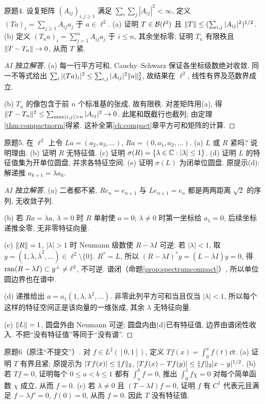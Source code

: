 \begin{exercise}\label{ps10:4}
原题4. 设复矩阵 $(A_{ij})_{i,j\ge1}$ 满足 $\sum_i\sum_j|A_{ij}|^2<\infty$, 定义 $(Ta)_i=\sum_{j\ge1}A_{ij}a_j$ 于 $a\in\ell^2$. (a) 证明 $T\in\mathcal B(\ell^2)$ 且 $\lVert T\rVert\le(\sum_{i,j}|A_{ij}|^2)^{1/2}$. (b) 定义 $(T_na)_i=\sum_{j=1}^nA_{ij}a_j$ 于 $i\le n$, 其余坐标零; 证明 $T_n$ 有限秩且 $\lVert T-T_n\rVert\to0$, 从而 $T$ 紧.
\end{exercise}
\begin{proof}[AI 独立解答]
(a) 每一行平方可和, Cauchy--Schwarz 保证各坐标级数绝对收敛. 同一不等式给出 $\sum_i|(Ta)_i|^2\le\sum_{i,j}|A_{ij}|^2\lVert a\rVert_2^2$, 故结果在 $\ell^2$, 线性有界及范数界成立.

(b) $T_n$ 的像包含于前 $n$ 个标准基的张成, 故有限秩. 对差矩阵用(a), 得 $\lVert T-T_n\rVert^2\le\sum_{\max(i,j)>n}|A_{ij}|^2\to0$. 此尾和既截行也截列; 由定理\ref{thm:compactnorm}得紧. 这补全第\ref{ch:compact}章平方可和矩阵的计算.
\end{proof}
\begin{exercise}\label{ps10:5}
原题5. 在 $\ell^2$ 上令 $La=(a_2,a_3,\ldots)$, $Ra=(0,a_1,a_2,\ldots)$. (a) $L$ 或 $R$ 紧吗? 说明理由. (b) 证明 $R$ 无特征值. (c) 证明 $\sigma(R)=\{\lambda\in\mathbb C:|\lambda|\le1\}$. (d) 证明 $L$ 的特征值集为开单位圆盘, 并求各特征空间. (e) 证明 $\sigma(L)$ 为闭单位圆盘. 原提示(d): 解递推 $a_{k+1}=\lambda a_k$.
\end{exercise}
\begin{proof}[AI 独立解答]
(a) 二者都不紧. $Re_n=e_{n+1}$ 与 $Le_{n+1}=e_n$ 都是两两距离 $\sqrt2$ 的序列, 无收敛子列.

(b) 若 $Ra=\lambda a$, $\lambda=0$ 时 $R$ 单射使 $a=0$; $\lambda\ne0$ 时第一坐标给 $a_1=0$, 后续坐标递推全零, 无非零特征向量.

(c) $\lVert R\rVert=1$, $|\lambda|>1$ 时 Neumann 级数使 $R-\lambda I$ 可逆. 若 $|\lambda|<1$, 取 $y=(1,\overline\lambda,\overline\lambda^2,\ldots)\in\ell^2\setminus\{0\}$. $R^*=L$, 所以 $(R-\lambda I)^*y=(L-\overline\lambda I)y=0$, 得 $\operatorname{ran}(R-\lambda I)\subset y^\perp\ne\ell^2$, 不可逆. 谱闭（命题\ref{prop:spectrumcompact}）, 所以单位圆边界也在谱中.

(d) 递推给出 $a=a_1(1,\lambda,\lambda^2,\ldots)$. 非零此列平方可和当且仅当 $|\lambda|<1$, 所以每个这样的特征空间正是该向量的一维张成, 其余 $\lambda$ 无特征向量.

(e) $\lVert L\rVert=1$, 圆盘外由 Neumann 可逆; 圆盘内由(d)已有特征值, 边界由谱闭性收入. 不把“没有特征值”等同于“没有谱”.
\end{proof}
\begin{exercise}\label{ps10:6}
原题6（原注“不提交”）. 对 $f\in L^2([0,1])$, 定义 $Tf(x)=\int_0^xf(t)\dd t$. (a) 证明 $T$ 有界且紧; 原提示为 $|Tf(x)|\le\lVert f\rVert_2$, $|Tf(x)-Tf(y)|\le\lVert f\rVert_2|x-y|^{1/2}$. (b) 若 $Tf=0$, 证明每个 $0\le a<b\le1$ 都有 $\int_a^bf=0$, 推出 $\int_0^1f\chi=0$ 对每个简单函数 $\chi$ 成立, 从而 $f=0$. (c) 若 $\lambda\ne0$ 且 $(T-\lambda I)f=0$, 证明 $f$ 有 $C^1$ 代表元且满足 $f-\lambda f'=0$, $f(0)=0$, 从而 $f=0$. 因此 $T$ 没有特征值.
\end{exercise}
